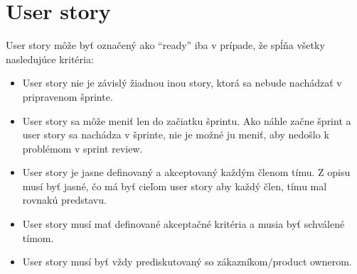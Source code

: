 \documentclass{article}
\begin{document}
    

    \section*{User story}

    \textnormal{User story môže byť označený ako “ready” iba v prípade, že spĺňa všetky nasledujúce kritéria:}

    \begin{itemize}
        \item User story nie je závislý žiadnou inou story, ktorá sa nebude nachádzať v pripravenom šprinte.
        \item User story sa môže meniť len do začiatku šprintu. Ako náhle začne šprint a user story sa nachádza v šprinte, nie je možné ju meniť, aby nedošlo k problémom v sprint review.
        \item User story je jasne definovaný a akceptovaný každým členom tímu. Z opisu musí byť jasné, čo má byť cieľom user story aby každý člen, tímu mal rovnakú predstavu.
        \item User story musí mať definované akceptačné kritéria a musia byť schválené tímom.
        \item User story musí byť vždy prediskutovaný so zákazníkom/product ownerom.
    \end{itemize}
\end{document}
